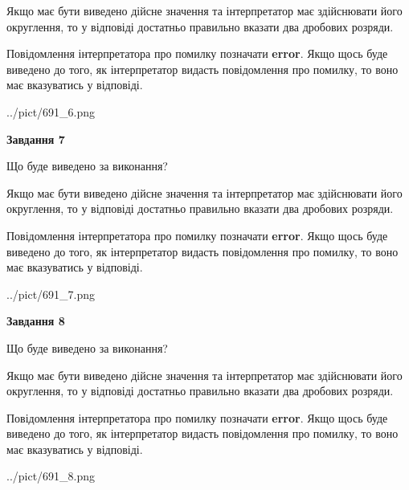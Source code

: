 \documentclass[12pt, ukrainian]{article}
\begin{document}
{\begin {Large}
Якщо має бути виведено дійсне значення та інтерпретатор має здійснювати його округлення, 
то у відповіді достатньо правильно вказати два дробових розряди.

Повідомлення інтерпретатора про помилку позначати \textbf{error}.
Якщо щось буде виведено до того, як інтерпретатор видасть повідомлення про помилку, 
то воно має вказуватись у відповіді. \par

\begin{center}
	{../pict/691_6.png}
\end{center}
\newpage

{\begin {center}\textbf{Завдання 7}\end {center}}\par
Що буде виведено за виконання? \par

Якщо має бути виведено дійсне значення та інтерпретатор має здійснювати його округлення, 
то у відповіді достатньо правильно вказати два дробових розряди.

Повідомлення інтерпретатора про помилку позначати \textbf{error}.
Якщо щось буде виведено до того, як інтерпретатор видасть повідомлення про помилку, 
то воно має вказуватись у відповіді. \par

\begin{center}
	{../pict/691_7.png}
\end{center}
\newpage

{\begin {center}\textbf{Завдання 8}\end {center}}\par
Що буде виведено за виконання? \par

Якщо має бути виведено дійсне значення та інтерпретатор має здійснювати його округлення, 
то у відповіді достатньо правильно вказати два дробових розряди.

Повідомлення інтерпретатора про помилку позначати \textbf{error}.
Якщо щось буде виведено до того, як інтерпретатор видасть повідомлення про помилку, 
то воно має вказуватись у відповіді. \par

\begin{center}
	{../pict/691_8.png}
\end{center}
\newpage


\end{Large}}
\end{document}
